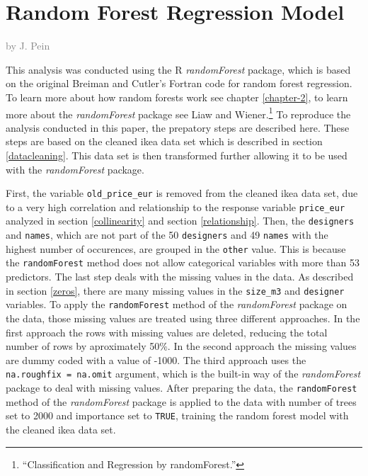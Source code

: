 \documentclass[a4paper, nobind]{templates/ociamthesis}
\begin{document}
\hypertarget{rf}{%
\section{Random Forest Regression Model}\label{rf}}

\textcolor{gray}{by J. Pein}

This analysis was conducted using the R \emph{randomForest} package, which is based on the original Breiman and Cutler's Fortran code for random forest regression. To learn more about how random forests work see chapter \ref{chapter-2}, to learn more about the \emph{randomForest} package see Liaw and Wiener.\footnote{``Classification and Regression by randomForest.''} To reproduce the analysis conducted in this paper, the prepatory steps are described here. These steps are based on the cleaned ikea data set which is described in section \ref{datacleaning}. This data set is then transformed further allowing it to be used with the \emph{randomForest} package.

First, the variable \texttt{old\_price\_eur} is removed from the cleaned ikea data set, due to a very high correlation and relationship to the response variable \texttt{price\_eur} analyzed in section \ref{collinearity} and section \ref{relationship}. Then, the \texttt{designers} and \texttt{names}, which are not part of the 50 \texttt{designers} and 49 \texttt{names} with the highest number of occurences, are grouped in the \texttt{other} value. This is because the \texttt{randomForest} method does not allow categorical variables with more than 53 predictors. The last step deals with the missing values in the data. As described in section \ref{zeros}, there are many missing values in the \texttt{size\_m3} and \texttt{designer} variables. To apply the \texttt{randomForest} method of the \emph{randomForest} package on the data, those missing values are treated using three different approaches. In the first approach the rows with missing values are deleted, reducing the total number of rows by aproximately 50\%. In the second approach the missing values are dummy coded with a value of -1000. The third approach uses the \texttt{na.roughfix\ =\ na.omit} argument, which is the built-in way of the \emph{randomForest} package to deal with missing values.
After preparing the data, the \texttt{randomForest} method of the \emph{randomForest} package is applied to the data with number of trees set to 2000 and importance set to \texttt{TRUE}, training the random forest model with the cleaned ikea data set.
\end{document}

